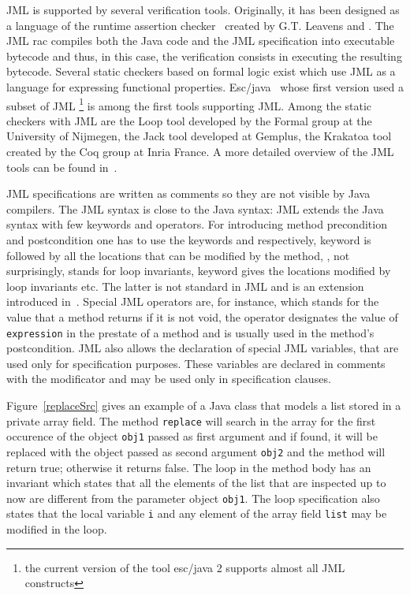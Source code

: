 JML is supported by several verification tools.
 Originally, it has been designed as a language of the runtime assertion checker~\cite{jmlrac} created by G.T. Leavens and . 
The JML rac compiles both the Java code and the JML specification into executable bytecode and thus, 
in this case, the verification consists in executing the resulting bytecode. Several static checkers based 
on formal logic exist which use JML as a language for expressing functional properties. Esc/java~\cite{escjava}  whose first version used a subset 
 of JML \footnote{the current version of the tool esc/java 2  supports almost all JML constructs} is among the first tools supporting JML.
Among the static checkers with JML  are
the Loop tool developed by the Formal group at the University of Nijmegen,
the Jack tool developed at Gemplus, the Krakatoa tool created by the Coq group at Inria France. A more detailed overview of the JML tools can  be found in~\cite{BurdyCCEKLLP03}.



JML specifications are written as comments so they are not visible by Java compilers. The JML syntax is close to the 
     Java syntax: JML extends the Java  syntax with few keywords and operators.
   For introducing method precondition and postcondition one has to use the keywords  and  
    respectively,   keyword is followed by all the locations that can be modified by the method, 
    , not surprisingly, stands for loop invariants,  keyword gives the locations modified by loop invariants etc. 
    The latter is not standard in JML and is an extension introduced in~\cite{BRL-JACK}. Special JML operators are, for instance,  which stands for the value that a method returns if it is not void, the  operator 
    designates the value of \texttt{expression} in the prestate of a method and is usually
   used in the method's postcondition. JML also allows the declaration of special JML variables, that are used only for specification purposes. 
  These variables are declared in comments with the  modificator and may be used only in specification clauses. 



     
Figure~\ref{replaceSrc} gives an example of a Java class that models a list stored in a private array field. 
The method \texttt{replace} will search in the array for the first occurence of the object \texttt{obj1} passed as first argument and if found, it will be replaced with the object passed as second argument \texttt{obj2} and the method will return true; otherwise it returns false. The loop in the method body has an invariant which states that all the elements of the list that are inspected up to now are different from the parameter object \texttt{obj1}. The loop specification also states
that the local variable \texttt{i} and any element of the array field \texttt{list} may be modified in the loop.

